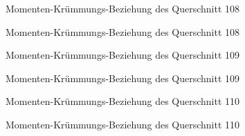 \documentclass[
  11pt,
  letterpaper,
]{scrreprt}
\begin{document}
\begin{figure}[H]


\caption{\label{fig-qs_108}Momenten-Krümmungs-Beziehung des Querschnitt
108}

\end{figure}%

\begin{figure}[H]


\caption{\label{fig-m_chi_108}Momenten-Krümmungs-Beziehung des
Querschnitt 108}

\end{figure}%

\begin{figure}[H]


\caption{\label{fig-qs_109}Momenten-Krümmungs-Beziehung des Querschnitt
109}

\end{figure}%

\begin{figure}[H]


\caption{\label{fig-m_chi_109}Momenten-Krümmungs-Beziehung des
Querschnitt 109}

\end{figure}%

\begin{figure}[H]


\caption{\label{fig-qs_110}Momenten-Krümmungs-Beziehung des Querschnitt
110}

\end{figure}%

\begin{figure}[H]


\caption{\label{fig-m_chi_110}Momenten-Krümmungs-Beziehung des
Querschnitt 110}

\end{figure}%
\end{document}
